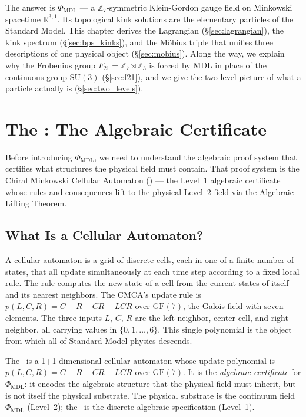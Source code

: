 \documentclass[11pt,openany]{book}
\theoremstyle{remark}
\newcommand{\PHIMDL}{\Phi_{\mathrm{MDL}}}
\newcommand{\ZS}{\mathbb{Z}_7}
\newcommand{\CMCA}{\text{CMCA}}
\newcommand{\poly}{p(L,C,R)}
\begin{document}
The answer is $\PHIMDL$ --- a $\mathbb{Z}_7$-symmetric Klein-Gordon gauge field on
Minkowski spacetime $\mathbb{R}^{3,1}$.
Its topological kink solutions are the elementary particles of the Standard Model.
This chapter derives the Lagrangian (\S\ref{sec:lagrangian}), the kink spectrum
(\S\ref{sec:bps_kinks}), and the Möbius triple that unifies three descriptions
of one physical object (\S\ref{sec:mobius}).
Along the way, we explain why the Frobenius group $F_{21} = \ZS\rtimes\mathbb{Z}_3$
is forced by MDL in place of the continuous group $\mathrm{SU}(3)$ (\S\ref{sec:f21}),
and we give the two-level picture of what a particle actually is (\S\ref{sec:two_levels}).

\section{The \CMCA: The Algebraic Certificate}
\label{sec:cmca}

Before introducing $\PHIMDL$, we need to understand the algebraic proof system that
certifies what structures the physical field must contain.
That proof system is the Chiral Minkowski Cellular Automaton (\CMCA) --- the
Level~1 algebraic certificate whose rules and consequences lift to the physical
Level~2 field via the Algebraic Lifting Theorem.

\subsection*{What Is a Cellular Automaton?}

A cellular automaton is a grid of discrete cells, each in one of a finite number of
states, that all update simultaneously at each time step according to a fixed local rule.
The rule computes the new state of a cell from the current states of itself and its
nearest neighbors.
The CMCA's update rule is $\poly = C+R-CR-LCR$ over $\mathrm{GF}(7)$,
the Galois field with seven elements.
The three inputs $L$, $C$, $R$ are the left neighbor, center cell, and right neighbor,
all carrying values in $\{0,1,\ldots,6\}$.
This single polynomial is the object from which all of Standard Model physics descends.

\begin{tcolorbox}[colback=green!5,colframe=green!50!black,
  title={Definition: Chiral Minkowski Cellular Automaton (\CMCA)}]
The \CMCA\ is a 1+1-dimensional cellular automaton whose update polynomial is
$\poly = C+R-CR-LCR$ over $\mathrm{GF}(7)$.
It is the \emph{algebraic certificate} for $\PHIMDL$: it encodes the algebraic structure
that the physical field must inherit, but is not itself the physical substrate.
The physical substrate is the continuum field $\PHIMDL$ (Level~2); the \CMCA\ is
the discrete algebraic specification (Level~1).
\end{tcolorbox}
\end{document}
